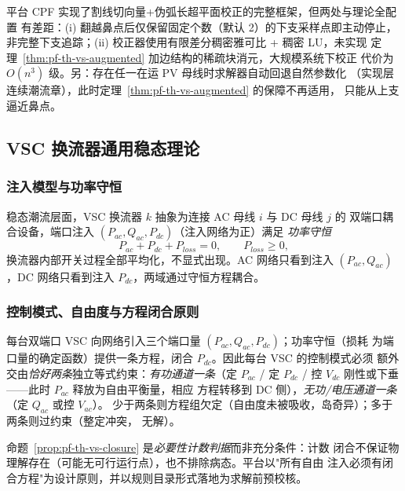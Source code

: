 \begin{gapnote}
平台 CPF 实现了割线切向量+伪弧长超平面校正的完整框架，但两处与理论全配置
有差距：(i) 翻越鼻点后仅保留固定个数（默认 2）的下支采样点即主动停止，
非完整下支追踪；(ii) 校正器使用有限差分稠密雅可比 + 稠密 LU，未实现
定理~\ref{thm:pf-th-vs-augmented} 加边结构的稀疏块消元，大规模系统下校正
代价为 $O(n^{3})$ 级。另：存在任一在运 PV 母线时求解器自动回退自然参数化
（实现层连续潮流章），此时定理~\ref{thm:pf-th-vs-augmented} 的保障不再适用，
只能从上支逼近鼻点。
\end{gapnote}

\subsection{VSC 换流器通用稳态理论}\label{sec:pf-th-vs-vsc}

\subsubsection{注入模型与功率守恒}
\begin{definition}\label{def:pf-th-vs-vsc}
稳态潮流层面，VSC 换流器 $k$ 抽象为连接 AC 母线 $i$ 与 DC 母线 $j$ 的
双端口耦合设备，端口注入 $(P_{ac},Q_{ac},P_{dc})$（注入网络为正）满足
\emph{功率守恒}
\begin{equation}
P_{ac}+P_{dc}+P_{loss}=0,\qquad P_{loss}\ge0,
\end{equation}
换流器内部开关过程全部平均化，不显式出现。AC 网络只看到注入
$(P_{ac},Q_{ac})$，DC 网络只看到注入 $P_{dc}$，两域通过守恒方程耦合。
\end{definition}

\subsubsection{控制模式、自由度与方程闭合原则}
\begin{proposition}[换流器方程闭合的计数判据]\label{prop:pf-th-vs-closure}
每台双端口 VSC 向网络引入三个端口量 $(P_{ac},Q_{ac},P_{dc})$；功率守恒（损耗
为端口量的确定函数）提供一条方程，闭合 $P_{dc}$。因此每台 VSC 的控制模式必须
额外交由\emph{恰好两条}独立等式约束：\emph{有功通道一条}（定 $P_{ac}$ /
定 $P_{dc}$ / 控 $V_{dc}$ 刚性或下垂——此时 $P_{ac}$ 释放为自由平衡量，相应
方程转移到 DC 侧），\emph{无功/电压通道一条}（定 $Q_{ac}$ 或控 $V_{ac}$）。
少于两条则方程组欠定（自由度未被吸收，岛奇异）；多于两条则过约束（整定冲突，
无解）。
\end{proposition}
\begin{remark}
命题~\ref{prop:pf-th-vs-closure} 是\emph{必要性计数判据}而非充分条件：计数
闭合不保证物理解存在（可能无可行运行点），也不排除病态。平台以"所有自由
注入必须有闭合方程"为设计原则，并以规则目录形式落地为求解前预校核。
\end{remark}

